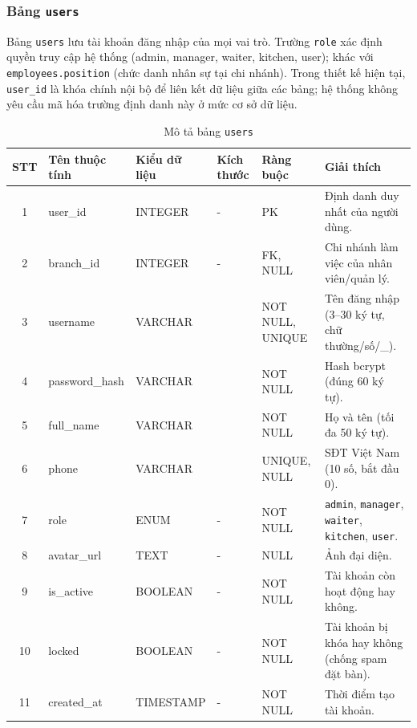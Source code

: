 \documentclass[../DoAn.tex]{subfiles}
\begin{document}
\subsubsection{Bảng \texttt{users}}

Bảng \texttt{users} lưu tài khoản đăng nhập của mọi vai trò. Trường \texttt{role} xác định quyền truy cập hệ thống
(admin, manager, waiter, kitchen, user); khác với \texttt{employees.position} (chức danh nhân sự tại chi nhánh).
Trong thiết kế hiện tại, \texttt{user\_id} là khóa chính nội bộ để liên kết dữ liệu giữa các bảng; hệ thống không yêu cầu mã hóa trường định danh này ở mức cơ sở dữ liệu.

\begin{table}[H]
\centering
\renewcommand{\arraystretch}{1.3}
\small
\begin{tabularx}{\textwidth}{|c|>{\RaggedRight\arraybackslash}p{2.9cm}|>{\Centering\arraybackslash}p{2.2cm}|>{\Centering\arraybackslash}p{1.3cm}|>{\Centering\arraybackslash}p{2.2cm}|>{\RaggedRight\arraybackslash}X|}
\hline
\textbf{STT} & \textbf{Tên thuộc tính} & \textbf{Kiểu dữ liệu} & \textbf{Kích thước} & \textbf{Ràng buộc} & \textbf{Giải thích} \\
\hline
1 & user\_id & INTEGER & - & PK & Định danh duy nhất của người dùng. \\ \hline
2 & branch\_id & INTEGER & - & FK, NULL & Chi nhánh làm việc của nhân viên/quản lý. \\ \hline
3 & username & VARCHAR & 30 & NOT NULL, UNIQUE & Tên đăng nhập (3--30 ký tự, chữ thường/số/\_). \\ \hline
4 & password\_hash & VARCHAR & 60 & NOT NULL & Hash bcrypt (đúng 60 ký tự). \\ \hline
5 & full\_name & VARCHAR & 50 & NOT NULL & Họ và tên (tối đa 50 ký tự). \\ \hline
6 & phone & VARCHAR & 10 & UNIQUE, NULL & SĐT Việt Nam (10 số, bắt đầu 0). \\ \hline
7 & role & ENUM & - & NOT NULL & \texttt{admin}, \texttt{manager}, \texttt{waiter}, \texttt{kitchen}, \texttt{user}. \\ \hline
8 & avatar\_url & TEXT & - & NULL & Ảnh đại diện. \\ \hline
9 & is\_active & BOOLEAN & - & NOT NULL & Tài khoản còn hoạt động hay không. \\ \hline
10 & locked & BOOLEAN & - & NOT NULL & Tài khoản bị khóa hay không (chống spam đặt bàn). \\ \hline
11 & created\_at & TIMESTAMP & - & NOT NULL & Thời điểm tạo tài khoản. \\ \hline
\end{tabularx}
\caption{Mô tả bảng \texttt{users}}
\end{table}
\end{document}
